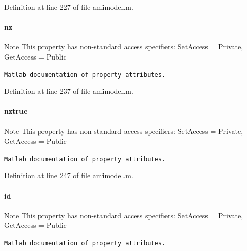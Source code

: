 Definition at line 227 of file amimodel.\+m.

\hypertarget{classamimodel_a79f11413e5bfe18a0e71e17574399ad5}{}
\paragraph[{nz}]{\setlength{\rightskip}{0pt plus 5cm}nz}\label{classamimodel_a79f11413e5bfe18a0e71e17574399ad5}
\begin{DoxyNote}{Note}
This property has non-\/standard access specifiers\+: {\ttfamily Set\+Access = Private, Get\+Access = Public} 

\href{http://www.mathworks.com/help/matlab/matlab_oop/property-attributes.html}{\tt Matlab documentation of property attributes.} 
\end{DoxyNote}


Definition at line 237 of file amimodel.\+m.

\hypertarget{classamimodel_a364ecd990baeeefd1de3e6795cd50a58}{}
\paragraph[{nztrue}]{\setlength{\rightskip}{0pt plus 5cm}nztrue}\label{classamimodel_a364ecd990baeeefd1de3e6795cd50a58}
\begin{DoxyNote}{Note}
This property has non-\/standard access specifiers\+: {\ttfamily Set\+Access = Private, Get\+Access = Public} 

\href{http://www.mathworks.com/help/matlab/matlab_oop/property-attributes.html}{\tt Matlab documentation of property attributes.} 
\end{DoxyNote}


Definition at line 247 of file amimodel.\+m.

\hypertarget{classamimodel_acf2488b95c97e0378c9bf49de3b50f28}{}
\paragraph[{id}]{\setlength{\rightskip}{0pt plus 5cm}id}\label{classamimodel_acf2488b95c97e0378c9bf49de3b50f28}
\begin{DoxyNote}{Note}
This property has non-\/standard access specifiers\+: {\ttfamily Set\+Access = Private, Get\+Access = Public} 

\href{http://www.mathworks.com/help/matlab/matlab_oop/property-attributes.html}{\tt Matlab documentation of property attributes.} 
\end{DoxyNote}


